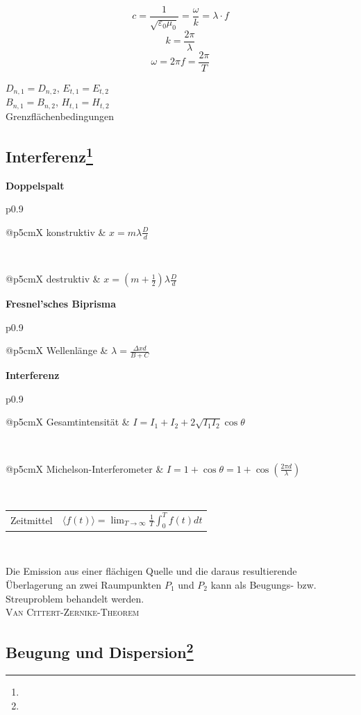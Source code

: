 \documentclass[12pt,a4paper, twoside]{article}
\makeatletter
\renewcommand{\=}[1]{\stackrel{#1}{=}}
\theoremstyle{definition}
\theoremstyle{remark}
\newcommand{\concept}[2]{%
\noindent
\begin{framed}
\noindent\textbf{#1}
\par\begin{tabular}{p{0.9\linewidth}}
#2
\end{tabular}
\end{framed}
}
\newcommand{\f}[2]{%
\noindent\begin{tabularx}{\linewidth}{@{}p{5cm}X}
#1 & $#2$
\end{tabularx}}
\makeatother
\begin{document}
\begin{center}
\begin{framed}
$$c = \frac{1}{\sqrt{\varepsilon_0 \mu_0}} = \frac{\omega}{k} = \lambda \cdot f$$
$$k = \frac{2\pi}{\lambda}$$
$$\omega = 2\pi f = \frac{2\pi}{T}$$
\end{framed}
\end{center}

\begin{center}
\begin{framed}
$D_{n,1} = D_{n,2}$, $E_{t,1} = E_{t,2}$\\
$B_{n,1} = B_{n,2}$, $H_{t,1} = H_{t,2}$\\
Grenzflächenbedingungen
\end{framed}
\end{center}

\subsection[Interferenz]{Interferenz\let\thefootnote\relax\footnote{}}

\concept{Doppelspalt}{
\f{konstruktiv}{x = m \lambda \frac{D}{d}}\\
\f{destruktiv}{x = (m+ \frac{1}{2}) \lambda \frac{D}{d}}
}

\concept{Fresnel'sches Biprisma}{
\f{Wellenlänge}{\lambda = \frac{\Delta x d}{B + C}}
}

\concept{Interferenz}{
\f{Gesamtintensität}{I = I_1 + I_2 + 2\sqrt{I_1 I_2} \cos \theta}\\
\f{Michelson-Interferometer}{I = 1+\cos \theta = 1+\cos(\frac{2\pi d}{\lambda})}\\
\f{Zeitmittel}{\langle f(t) \rangle = \lim_{T \rightarrow \infty} \frac{1}{T} \int_0^T f(t) dt}\\
}

\begin{center}
\begin{framed}
Die Emission aus einer flächigen Quelle und die daraus resultierende Überlagerung an zwei Raumpunkten $P_1$ und $P_2$ kann als Beugungs- bzw. Streuproblem behandelt werden.\\
\centering\textsc{Van Cittert-Zernike-Theorem}
\end{framed}
\end{center}

\subsection[Beugung und Dispersion]{Beugung und Dispersion\let\thefootnote\relax\footnote{}}
\end{document}
